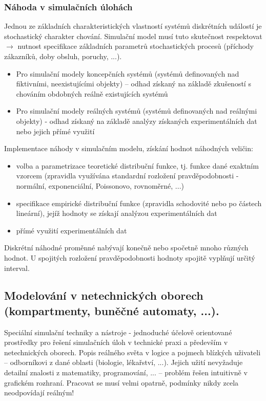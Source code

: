 \subsubsection*{Náhoda v simulačních úlohách}
Jednou ze základních charakteristických vlastností systémů diskrétních událostí je stochastický charakter chování. Simulační model musí tuto skutečnost respektovat $ \to $ nutnost specifikace základních parametrů stochastických procesů (příchody zákazníků, doby obsluh, poruchy, ...).
\begin{itemize}
\item Pro simulační modely koncepčních systémů (systémů definovaných nad fiktivními, neexistujícími objekty) – odhad získaný na základě zkušeností s chováním obdobných reálně existujících systémů
\item Pro simulační modely reálných systémů (systémů definovaných nad reálnými objekty) - odhad získaný na základě analýzy získaných experimentálních dat nebo jejich přímé využití
\end{itemize}
Implementace náhody v simulačním modelu, získání hodnot náhodných veličin:
\begin{itemize}
\item volba a parametrizace teoretické distribuční funkce, tj. funkce dané exaktním vzorcem (zpravidla využívána standardní rozložení pravděpodobnosti - normální, exponenciální, Poissonovo, rovnoměrné, ...)
\item specifikace empirické distribuční funkce (zpravidla schodovité nebo po částech lineární), jejíž hodnoty se získají analýzou experimentálních dat
\item přímé využití experimentálních dat
\end{itemize}
Diskrétní náhodné proměnné nabývají konečně nebo spočetně mnoho různých hodnot. U spojitých rozložení pravděpodobnosti hodnoty spojitě vyplňují určitý interval.

\subsection{Modelování v netechnických oborech (kompartmenty, buněčné automaty, ...).}
Speciální simulační techniky a nástroje - jednoduché účelově orientované prostředky pro řešení simulačních úloh v technické praxi a především v netechnických oborech. Popis reálného světa v logice a pojmech blízkých uživateli – odborníkovi z dané oblasti (biologie, lékařství, ...). Jejich užití nevyžaduje detailní znalosti z matematiky, programování, ... – problém řešen intuitivně v grafickém rozhraní. Pracovat se musí velmi opatrně, podmínky nikdy zcela neodpovídají reálným!

